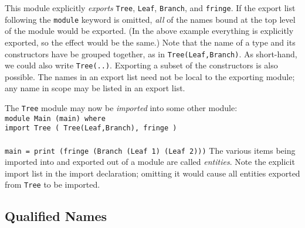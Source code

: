 This module explicitly {\em exports} \mbox{\tt Tree}, \mbox{\tt Leaf}, \mbox{\tt Branch}, and
\mbox{\tt fringe}.  If the export list following the \mbox{\tt module} keyword is
omitted, {\em all} of the names bound at the top level of the module
would be exported.  (In the above example everything is explicitly
exported, so the effect would be the same.)  Note that the name of a
type and its constructors have be grouped together, as in
\mbox{\tt Tree(Leaf,Branch)}.  As short-hand, we could also write \mbox{\tt Tree(..)}.
Exporting a subset of the constructors is also possible.  The names in
an export list need not be local to the exporting module; any name in
scope may be listed in an export list. 

The \mbox{\tt Tree} module may now be {\em imported} into some other module:
\bprog
\mbox{\tt module\ Main\ (main)\ where}\\
\mbox{\tt import\ Tree\ (\ Tree(Leaf,Branch),\ fringe\ )}\\
\mbox{\tt }\\[-8pt]
\mbox{\tt main\ =\ print\ (fringe\ (Branch\ (Leaf\ 1)\ (Leaf\ 2)))}
\eprog 
The various items being imported into and exported out of a module are
called {\em entities}.  Note the explicit import list in the import
declaration; omitting it would cause all entities exported from \mbox{\tt Tree}
to be imported.

\subsection{Qualified Names}

